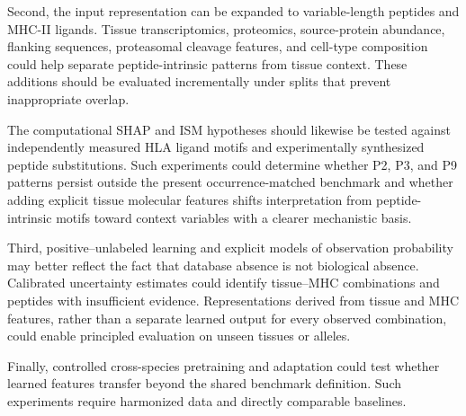 Second, the input representation can be expanded to variable-length peptides and MHC-II ligands. Tissue transcriptomics, proteomics, source-protein abundance, flanking sequences, proteasomal cleavage features, and cell-type composition could help separate peptide-intrinsic patterns from tissue context. These additions should be evaluated incrementally under splits that prevent inappropriate overlap.

The computational SHAP and ISM hypotheses should likewise be tested against independently measured HLA ligand motifs and experimentally synthesized peptide substitutions. Such experiments could determine whether P2, P3, and P9 patterns persist outside the present occurrence-matched benchmark and whether adding explicit tissue molecular features shifts interpretation from peptide-intrinsic motifs toward context variables with a clearer mechanistic basis.

Third, positive--unlabeled learning and explicit models of observation probability may better reflect the fact that database absence is not biological absence. Calibrated uncertainty estimates could identify tissue--MHC combinations and peptides with insufficient evidence. Representations derived from tissue and MHC features, rather than a separate learned output for every observed combination, could enable principled evaluation on unseen tissues or alleles.

Finally, controlled cross-species pretraining and adaptation could test whether learned features transfer beyond the shared benchmark definition. Such experiments require harmonized data and directly comparable baselines.
